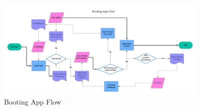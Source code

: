 \documentclass[a4paper, 12pt]{report} %
\begin{document}
            \begin{figure}
                \centering
                \includegraphics[width=0.9\textwidth]{Images/auth_flow.png}
                \caption{Booting App Flow}
                \label{fig:auth_flow}
             \end{figure}

    \FloatBarrier
        
        \pagebreak
\end{document}
